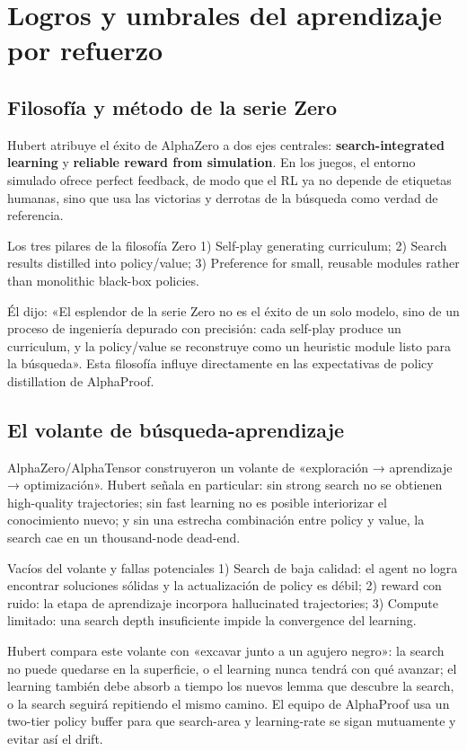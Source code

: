 \documentclass[a4paper]{article}
\begin{document}
\section{Logros y umbrales del aprendizaje por refuerzo}

\subsection{Filosofía y método de la serie Zero}
Hubert atribuye el éxito de AlphaZero a dos ejes centrales: \textbf{search-integrated learning} y \textbf{reliable reward from simulation}. En los juegos, el entorno simulado ofrece perfect feedback, de modo que el RL ya no depende de etiquetas humanas, sino que usa las victorias y derrotas de la búsqueda como verdad de referencia.
\begin{knowledgebox}{Los tres pilares de la filosofía Zero}
1) Self-play generating curriculum; 2) Search results distilled into policy/value; 3) Preference for small, reusable modules rather than monolithic black-box policies.
\end{knowledgebox}

Él dijo: «El esplendor de la serie Zero no es el éxito de un solo modelo, sino de un proceso de ingeniería depurado con precisión: cada self-play produce un curriculum, y la policy/value se reconstruye como un heuristic module listo para la búsqueda». Esta filosofía influye directamente en las expectativas de policy distillation de AlphaProof.

\subsection{El volante de búsqueda-aprendizaje}
AlphaZero/AlphaTensor construyeron un volante de «exploración → aprendizaje → optimización». Hubert señala en particular: sin strong search no se obtienen high-quality trajectories; sin fast learning no es posible interiorizar el conocimiento nuevo; y sin una estrecha combinación entre policy y value, la search cae en un thousand-node dead-end.
\begin{warningbox}{Vacíos del volante y fallas potenciales}
1) Search de baja calidad: el agent no logra encontrar soluciones sólidas y la actualización de policy es débil; 2) reward con ruido: la etapa de aprendizaje incorpora hallucinated trajectories; 3) Compute limitado: una search depth insuficiente impide la convergence del learning.
\end{warningbox}

Hubert compara este volante con «excavar junto a un agujero negro»: la search no puede quedarse en la superficie, o el learning nunca tendrá con qué avanzar; el learning también debe absorb a tiempo los nuevos lemma que descubre la search, o la search seguirá repitiendo el mismo camino. El equipo de AlphaProof usa un two-tier policy buffer para que search-area y learning-rate se sigan mutuamente y evitar así el drift.
\end{document}
